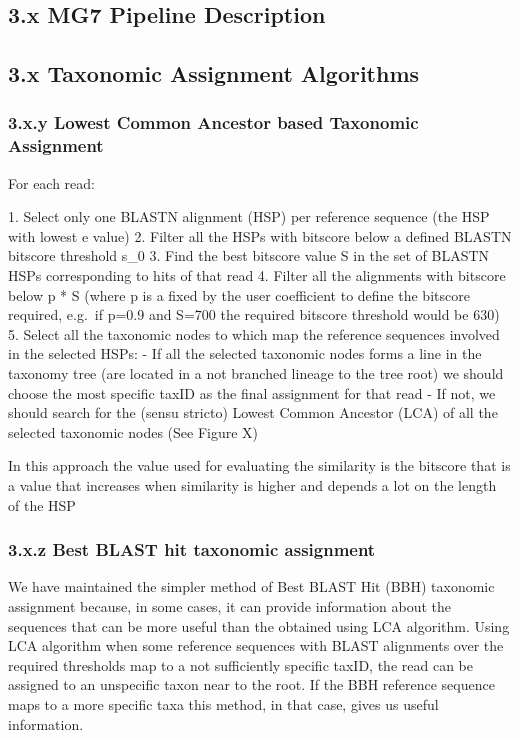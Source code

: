 \documentclass{frontiersSCNS} %
\begin{document}
\subsection{3.x MG7 Pipeline
Description}\label{x-mg7-pipeline-description}

\subsection{3.x Taxonomic Assignment
Algorithms}\label{x-taxonomic-assignment-algorithms}

\subsubsection{3.x.y Lowest Common Ancestor based Taxonomic
Assignment}\label{x.y-lowest-common-ancestor-based-taxonomic-assignment}

For each read:

­1. Select only one BLASTN alignment (HSP) per reference sequence (the
HSP with lowest e value) 2. Filter all the HSPs with bitscore below a
defined BLASTN bitscore threshold s\_0 3. Find the best bitscore value S
in the set of BLASTN HSPs corresponding to hits of that read 4. Filter
all the alignments with bitscore below p * S (where p is a fixed by the
user coefficient to define the bitscore required, e.g.~if p=0.9 and
S=700 the required bitscore threshold would be 630) 5. Select all the
taxonomic nodes to which map the reference sequences involved in the
selected HSPs: - If all the selected taxonomic nodes forms a line in the
taxonomy tree (are located in a not branched lineage to the tree root)
we should choose the most specific taxID as the final assignment for
that read - If not, we should search for the (sensu stricto) Lowest
Common Ancestor (LCA) of all the selected taxonomic nodes (See Figure X)

In this approach the value used for evaluating the similarity is the
bitscore that is a value that increases when similarity is higher and
depends a lot on the length of the HSP

\subsubsection{3.x.z Best BLAST hit taxonomic
assignment}\label{x.z-best-blast-hit-taxonomic-assignment}

We have maintained the simpler method of Best BLAST Hit (BBH) taxonomic
assignment because, in some cases, it can provide information about the
sequences that can be more useful than the obtained using LCA algorithm.
Using LCA algorithm when some reference sequences with BLAST alignments
over the required thresholds map to a not sufficiently specific taxID,
the read can be assigned to an unspecific taxon near to the root. If the
BBH reference sequence maps to a more specific taxa this method, in that
case, gives us useful information.
\end{document}

